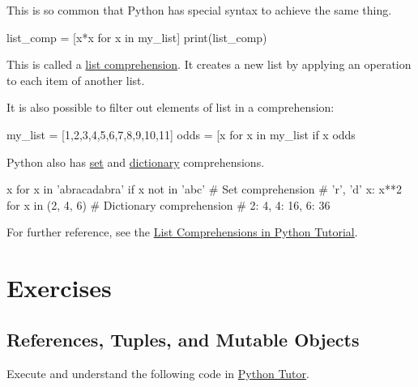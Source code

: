 \documentclass[12pt,letterpaper,twoside]{article}
\begin{document}
This is so common that Python has special syntax to achieve the same
thing.

\begin{python}
list_comp = [x*x for x in my_list]
print(list_comp)
\end{python}

This is called a
\href{https://docs.python.org/3/tutorial/datastructures.html\#list-comprehensions}{list
comprehension}. It creates a new list by applying an operation to each
item of another list.

It is also possible to filter out elements of list in a comprehension:

\begin{python}
my_list = [1,2,3,4,5,6,7,8,9,10,11]
odds = [x for x in my_list if x %
odds
\end{python}

Python also has
\href{https://docs.python.org/3/tutorial/datastructures.html#sets}{set}
and
\href{https://docs.python.org/3/tutorial/datastructures.html#dictionaries}{dictionary}
comprehensions.

\begin{python}
{x for x in 'abracadabra' if x not in 'abc'}  # Set comprehension
# {'r', 'd'}
{x: x**2 for x in (2, 4, 6)}                  # Dictionary comprehension
# {2: 4, 4: 16, 6: 36}
\end{python}

For further reference, see the 
\href{https://docs.python.org/3/tutorial/datastructures.html\#list-comprehensions}{List Comprehensions in Python Tutorial}.

\newpage

\section{Exercises}

\subsection{References, Tuples, and Mutable Objects}
Execute and understand the following code in
\href{http://www.pythontutor.com/visualize.html\#code=sub_list_1\%20\%3D\%20\%5B1,3,8\%5D\%0Asub_list_2\%20\%3D\%20\%5B'z','y','x'\%5D\%0Amy_list\%20\%3D\%20\%5B2,\%20'a\%20string',\%20sub_list_1\%5D\%0Amy_list\%5B2\%5D\%20\%3D\%20sub_list_2\%0Amy_list\%5B2\%5D\%5B0\%5D\%20\%3D\%20'new\%20string'\%0A\%0Amy_tup\%20\%3D\%20(2,\%20'a\%20string',\%20sub_list_1\%29\%0A\%0A\%23\%20cannot\%20modify\%20tuple\%20references\%0A\%23\%20my_tup\%5B2\%5D\%20\%3D\%20sub_list_2\%0A\%0A\%23\%20we\%20can\%20modify\%20a\%20mutable\%20object\%20referenced\%20by\%20a\%20tuple\%0Amy_tup\%5B2\%5D\%5B0\%5D\%20\%3D\%20'from\%20my_tup'\%0A\%0A\%23\%20can\%20can\%20look\%20at\%20object\%20ids\%0Aprint(id(sub_list_1\%29\%29\%0Aprint(id(my_tup\%5B2\%5D\%29\%29\&cumulative=false\&curInstr=0\&heapPrimitives=false\&mode=display\&origin=opt-frontend.js\&py=3\&rawInputLstJSON=\%5B\%5D\&textReferences=false}{Python
Tutor}.
\end{document}
